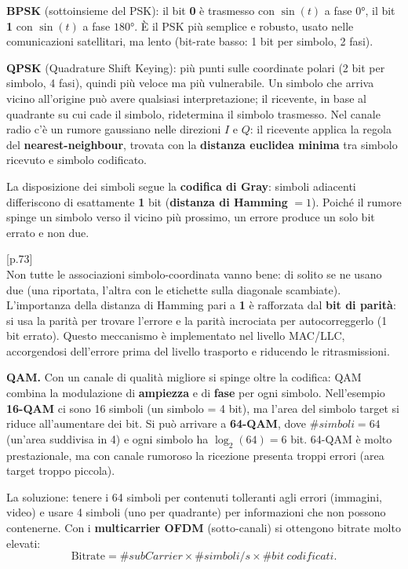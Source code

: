 \documentclass[11pt,a4paper]{report}
\begin{document}
\textbf{BPSK} (sottoinsieme del PSK): il bit \textbf{0} è trasmesso con $\sin(t)$ a fase $0°$, il bit \textbf{1} con $\sin(t)$ a fase $180°$. È il PSK più semplice e robusto, usato nelle comunicazioni satellitari, ma lento (bit-rate basso: 1 bit per simbolo, 2 fasi).

\textbf{QPSK} (Quadrature Shift Keying): più punti sulle coordinate polari (2 bit per simbolo, 4 fasi), quindi più veloce ma più vulnerabile. Un simbolo che arriva vicino all'origine può avere qualsiasi interpretazione; il ricevente, in base al quadrante su cui cade il simbolo, ridetermina il simbolo trasmesso. Nel canale radio c'è un rumore gaussiano nelle direzioni $I$ e $Q$: il ricevente applica la regola del \textbf{nearest-neighbour}, trovata con la \textbf{distanza euclidea minima} tra simbolo ricevuto e simbolo codificato.

La disposizione dei simboli segue la \textbf{codifica di Gray}: simboli adiacenti differiscono di esattamente \textbf{1} bit (\textbf{distanza di Hamming} $=1$). Poiché il rumore spinge un simbolo verso il vicino più prossimo, un errore produce un solo bit errato e non due.

\noindent\hfill{\footnotesize\color{gray}[p.73]}\\
Non tutte le associazioni simbolo-coordinata vanno bene: di solito se ne usano due (una riportata, l'altra con le etichette sulla diagonale scambiate). L'importanza della distanza di Hamming pari a \textbf{1} è rafforzata dal \textbf{bit di parità}: si usa la parità per trovare l'errore e la parità incrociata per autocorreggerlo (1 bit errato). Questo meccanismo è implementato nel livello MAC/LLC, accorgendosi dell'errore prima del livello trasporto e riducendo le ritrasmissioni.

\textbf{QAM.} Con un canale di qualità migliore si spinge oltre la codifica: QAM combina la modulazione di \textbf{ampiezza} e di \textbf{fase} per ogni simbolo. Nell'esempio \textbf{16-QAM} ci sono 16 simboli (un simbolo = 4 bit), ma l'area del simbolo target si riduce all'aumentare dei bit. Si può arrivare a \textbf{64-QAM}, dove $\#simboli = 64$ (un'area suddivisa in 4) e ogni simbolo ha $\log_2(64) = 6$ bit. 64-QAM è molto prestazionale, ma con canale rumoroso la ricezione presenta troppi errori (area target troppo piccola).

La soluzione: tenere i 64 simboli per contenuti tolleranti agli errori (immagini, video) e usare 4 simboli (uno per quadrante) per informazioni che non possono contenerne. Con i \textbf{multicarrier OFDM} (sotto-canali) si ottengono bitrate molto elevati:
\[ \text{Bitrate} = \#subCarrier \times \#simboli/s \times \#bit\ codificati. \]
\end{document}
